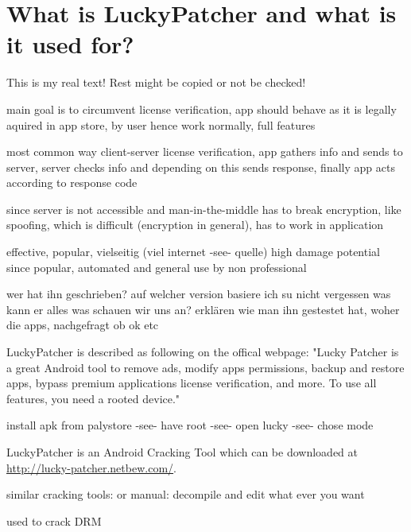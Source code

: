 \section{What is LuckyPatcher and what is it used for?} \label{section:luckypatcher-explain}
This is my real text! Rest might be copied or not be checked!

%
main goal is to circumvent license verification, app should behave as it is legally aquired in app store, by user hence work normally, full features

most common way client-server license verification, app gathers info and sends to server, server checks info and depending on this sends response, finally app acts according to response code

since server is not accessible and man-in-the-middle has to break encryption, like spoofing, which is difficult (encryption in general), has to work in application

effective, popular, vielseitig (viel internet -see- quelle)
high damage potential since popular, automated and general use by non professional

\cite{munteanLicense}
%

wer hat ihn geschrieben?\newline
auf welcher version basiere ich\newline
su nicht vergessen\newline
was kann er alles\newline
was schauen wir uns an?\newline
erklären wie man ihn gestestet hat, woher die apps, nachgefragt ob ok etc\newline

LuckyPatcher is described as following on the offical webpage: "Lucky Patcher is a great Android tool to remove ads, modify apps permissions, backup and restore apps, bypass premium applications license verification, and more. To use all features, you need a rooted device." \cite{luckyPatcherOfficial}

install apk from palystore -see- have root -see- open lucky -see- chose mode

LuckyPatcher is an Android Cracking Tool which can be downloaded at \url{http://lucky-patcher.netbew.com/}.

similar cracking tools:\newline
or manual: decompile and edit what ever you want \newline

used to crack DRM

